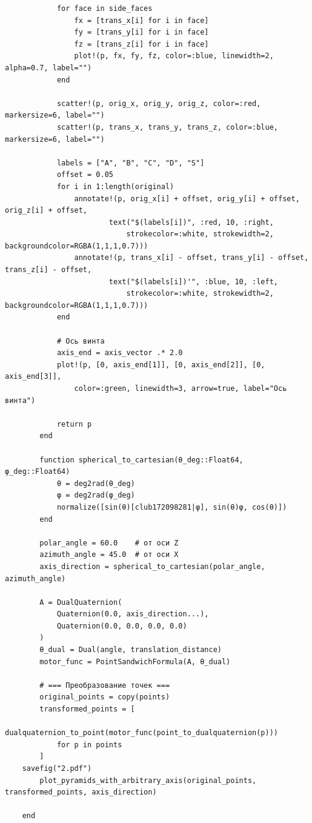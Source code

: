 \begin{verbatim}
            for face in side_faces
                fx = [trans_x[i] for i in face]
                fy = [trans_y[i] for i in face]
                fz = [trans_z[i] for i in face]
                plot!(p, fx, fy, fz, color=:blue, linewidth=2, alpha=0.7, label="")
            end

            scatter!(p, orig_x, orig_y, orig_z, color=:red, markersize=6, label="")
            scatter!(p, trans_x, trans_y, trans_z, color=:blue, markersize=6, label="")

            labels = ["A", "B", "C", "D", "S"]
            offset = 0.05
            for i in 1:length(original)
                annotate!(p, orig_x[i] + offset, orig_y[i] + offset, orig_z[i] + offset,
                        text("$(labels[i])", :red, 10, :right,
                            strokecolor=:white, strokewidth=2, backgroundcolor=RGBA(1,1,1,0.7)))
                annotate!(p, trans_x[i] - offset, trans_y[i] - offset, trans_z[i] - offset,
                        text("$(labels[i])'", :blue, 10, :left,
                            strokecolor=:white, strokewidth=2, backgroundcolor=RGBA(1,1,1,0.7)))
            end

            # Ось винта
            axis_end = axis_vector .* 2.0
            plot!(p, [0, axis_end[1]], [0, axis_end[2]], [0, axis_end[3]],
                color=:green, linewidth=3, arrow=true, label="Ось винта")

            return p
        end

        function spherical_to_cartesian(θ_deg::Float64, φ_deg::Float64)
            θ = deg2rad(θ_deg)
            φ = deg2rad(φ_deg)
            normalize([sin(θ)[club172098281|φ], sin(θ)φ, cos(θ)])
        end

        polar_angle = 60.0    # от оси Z
        azimuth_angle = 45.0  # от оси X
        axis_direction = spherical_to_cartesian(polar_angle, azimuth_angle)

        A = DualQuaternion(
            Quaternion(0.0, axis_direction...),
            Quaternion(0.0, 0.0, 0.0, 0.0)
        )
        θ_dual = Dual(angle, translation_distance)
        motor_func = PointSandwichFormula(A, θ_dual)

        # === Преобразование точек ===
        original_points = copy(points)
        transformed_points = [
            dualquaternion_to_point(motor_func(point_to_dualquaternion(p)))
            for p in points
        ]
    savefig("2.pdf")
        plot_pyramids_with_arbitrary_axis(original_points, transformed_points, axis_direction)

    end
\end{verbatim}

